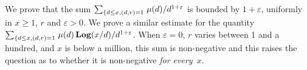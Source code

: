 \documentclass[11pt,a4paper,twoside]{article}
\def\Log{\mathop{\textbf{Log}}}
\begin{document}
  We prove that the sum $\sum_{\left\{{d\le x,\\
        (d,r)=1}\right.}\mu(d)/d^{1+\varepsilon}$ is bounded by $1+\varepsilon$, uniformly in
  $x\ge1$, $r$ and $\varepsilon>0$. We prove a similar estimate for the quantity
  $\sum_{\left\{{d\le x,\\
        (d,r)=1}\right.}\mu(d)\Log(x/d)/d^{1+\varepsilon}$. When $\varepsilon=0$, $r$ varies
  between 1 and a hundred, and $x$ is
  below a million, this sum is non-negative and this raises the question as to
  whether it is non-negative \emph{for every~$x$}.
\end{document}
